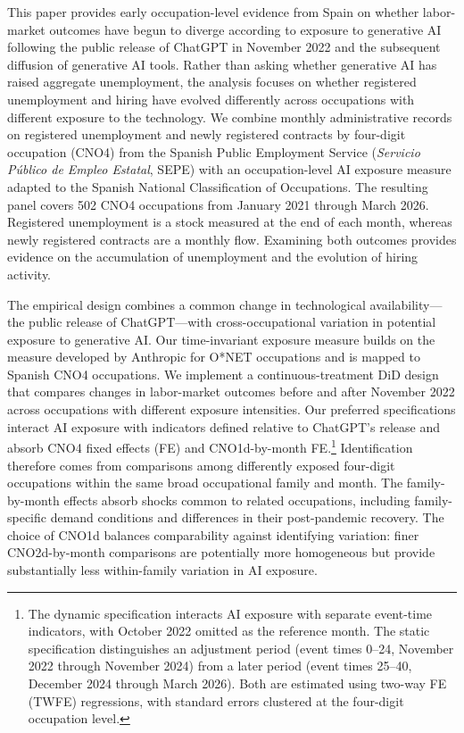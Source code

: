 This paper provides early occupation-level evidence from Spain on whether labor-market outcomes have begun to diverge according to exposure to generative AI following the public release of ChatGPT in November 2022 and the subsequent diffusion of generative AI tools. Rather than asking whether generative AI has raised aggregate unemployment, the analysis focuses on whether registered unemployment and hiring have evolved differently across occupations with different exposure to the technology. We combine monthly administrative records on registered unemployment and newly registered contracts by four-digit occupation (CNO4) from the Spanish Public Employment Service (\textit{Servicio P\'ublico de Empleo Estatal}, SEPE) with an occupation-level AI exposure measure adapted to the Spanish National Classification of Occupations. The resulting panel covers 502 CNO4 occupations from January 2021 through March 2026. Registered unemployment is a stock measured at the end of each month, whereas newly registered contracts are a monthly flow. Examining both outcomes provides evidence on the accumulation of unemployment and the evolution of hiring activity.

The empirical design combines a common change in technological availability---the public release of ChatGPT---with cross-occupational variation in potential exposure to generative AI. Our time-invariant exposure measure builds on the measure developed by Anthropic for O*NET occupations \citep{massenkoff_mccrory_2026} and is mapped to Spanish CNO4 occupations. We implement a continuous-treatment DiD design that compares changes in labor-market outcomes before and after November 2022 across occupations with different exposure intensities. Our preferred specifications interact AI exposure with indicators defined relative to ChatGPT's release and absorb CNO4 fixed effects (FE) and CNO1d-by-month FE.\footnote{The dynamic specification interacts AI exposure with separate event-time indicators, with October 2022 omitted as the reference month. The static specification distinguishes an adjustment period (event times 0--24, November 2022 through November 2024) from a later period (event times 25--40, December 2024 through March 2026). Both are estimated using two-way FE (TWFE) regressions, with standard errors clustered at the four-digit occupation level.} Identification therefore comes from comparisons among differently exposed four-digit occupations within the same broad occupational family and month. The family-by-month effects absorb shocks common to related occupations, including family-specific demand conditions and differences in their post-pandemic recovery. The choice of CNO1d balances comparability against identifying variation: finer CNO2d-by-month comparisons are potentially more homogeneous but provide substantially less within-family variation in AI exposure.

